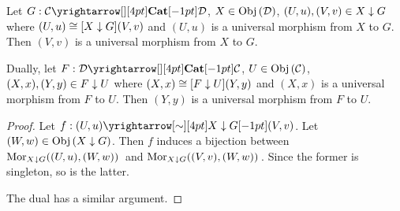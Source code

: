 \begin{prop}
  
  Let $G : \map{\CC}{\DD}{\CAT}{}$, $X \in \obj{\DD}$, 
  $(U,u), (V,v) \in X\darrow G$ where 
  $(U,u) \iso[X\darrow G] (V,v)$ and 
  $(U,u)$ is a universal morphism from $X$ to $G$.
  Then $(V,v)$ is a universal morphism from $X$ to $G$.

  Dually, let $F : \map{\DD}{\CC}{\CAT}{}$, $U \in \obj{\CC}$,
  $(X,x), (Y,y) \in F\darrow U$ where $(X,x) \iso[F\darrow U] (Y,y)$ and 
  $(X,x)$ is a universal morphism from $F$ to $U$. 
  Then $(Y,y)$ is a universal morphism from $F$ to $U$. 
\end{prop}
\begin{proof}
  Let $f : \map{(U,u)}{(V,v)}{X\darrow G}{\sim}$.
  Let $(W,w)\in\obj{X\darrow G}$. 
  Then $f$ induces a bijection between $\mor{(U,u)}{(W,w)}{X\darrow G}$
  and $\mor{(V,v)}{(W,w)}{X\darrow G}$. 
  Since the former is singleton, so is the latter. 

  The dual has a similar argument. 
\end{proof}


